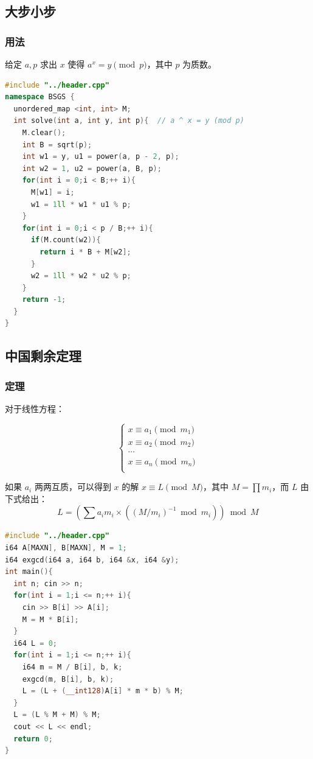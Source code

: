 \documentclass[10pt]{ctexart}
\begin{document}
\begin{multicols}{3}
    \subsection{大步小步}\label{ux5927ux6b65ux5c0fux6b65}

    \subsubsection{用法}\label{ux7528ux6cd5-4}

    给定 \(a, p\) 求出 \(x\) 使得 \(a^x = y \pmod p\)，其中 \(p\)
    为质数。

\begin{lstlisting}[language={C++}]
#include "../header.cpp"
namespace BSGS {
  unordered_map <int, int> M;
  int solve(int a, int y, int p){  // a ^ x = y (mod p)
    M.clear();
    int B = sqrt(p);
    int w1 = y, u1 = power(a, p - 2, p);
    int w2 = 1, u2 = power(a, B, p);
    for(int i = 0;i < B;++ i){
      M[w1] = i;
      w1 = 1ll * w1 * u1 % p;
    }
    for(int i = 0;i < p / B;++ i){
      if(M.count(w2)){
        return i * B + M[w2];
      }
      w2 = 1ll * w2 * u2 % p;
    }
    return -1;
  }
}
\end{lstlisting}

    \subsection{中国剩余定理}\label{ux4e2dux56fdux5269ux4f59ux5b9aux7406}

    \subsubsection{定理}\label{ux5b9aux7406}

    对于线性方程：

    \[
    \begin{cases}
    x \equiv a_1 \pmod {m_1} \\
    x \equiv a_2 \pmod {m_2} \\
    \cdots \\
    x \equiv a_n \pmod {m_n} \\
    \end{cases}
    \]

    如果 \(a_i\) 两两互质，可以得到 \(x\) 的解
    \(x\equiv L\pmod M\)，其中 \(M=\prod m_i\)，而 \(L\)
    由下式给出：\[L = \left(\sum a_i m_i\times (\left(M/m_i\right)^{-1}\bmod m_i)\right)\bmod M\]

\begin{lstlisting}[language={C++}]
#include "../header.cpp"
i64 A[MAXN], B[MAXN], M = 1;
i64 exgcd(i64 a, i64 b, i64 &x, i64 &y);
int main(){
  int n; cin >> n;
  for(int i = 1;i <= n;++ i){
    cin >> B[i] >> A[i];
    M = M * B[i];
  }
  i64 L = 0;
  for(int i = 1;i <= n;++ i){
    i64 m = M / B[i], b, k;
    exgcd(m, B[i], b, k);
    L = (L + (__int128)A[i] * m * b) % M;
  }
  L = (L % M + M) % M;
  cout << L << endl;
  return 0;
}
\end{lstlisting}


\end{multicols}
\end{document}
